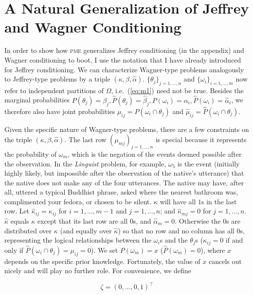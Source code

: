 \documentclass[entropy,article,accept,oneauthor,pdftex,12pt,a4paper]{mdpi}
\begin{document}
\section{A Natural Generalization of Jeffrey and Wagner Conditioning}
\label{Generalization}

In order to show how \textsc{pme} generalizes Jeffrey conditioning (in
the appendix) and Wagner conditioning to boot, I use the notation that
I have already introduced for Jeffrey conditioning. We can
characterize Wagner-type problems analogously to Jeffrey-type problems
by a triple $(\kappa,\beta,\hat{\alpha})$.
$\{\theta_{j}\}_{j=1,\ldots,n}$ and $\{\omega_{i}\}_{i=1,\ldots,m}$
now refer to independent partitions of $\Omega$, i.e.\ (\ref{eq:m1})
need not be true. Besides the marginal probabilities
$P(\theta_{j})=\beta_{j}, \hat{P}(\theta_{j})=\hat{\beta}_{j},
P(\omega_{i})=\alpha_{i},\hat{P}(\omega_{i})=\hat{\alpha}_{i}$, we
therefore also have joint probabilities
$\mu_{ij}=P(\omega_{i}\cap\theta_{j})$ and
$\hat{\mu}_{ij}=\hat{P}(\omega_{i}\cap\theta_{j})$.

Given the specific nature of Wagner-type problems, there are a few
constraints on the triple $(\kappa,\beta,\hat{\alpha})$. The last row
$(\mu_{mj})_{j=1,\ldots,n}$ is special because it represents the
probability of $\omega_{m}$, which is the negation of the events
deemed possible after the observation. In the \emph{Linguist} problem,
for example, $\omega_{5}$ is the event (initially highly likely, but
impossible after the observation of the native's utterance) that the
native does not make any of the four utterances. The native may have,
after all, uttered a typical Buddhist phrase, asked where the nearest
bathroom was, complimented your fedora, or chosen to be silent.
$\kappa$ will have all $1$s in the last row. Let
$\hat{\kappa}_{ij}=\kappa_{ij}$ for $i=1,\ldots,m-1$ and
$j=1,\ldots,n$; and $\hat{\kappa}_{mj}=0$ for $j=1,\ldots,n$.
$\hat{\kappa}$ equals $\kappa$ except that its last row are all $0$s,
and $\hat{\alpha}_{m}=0$. Otherwise the $0$s are distributed over
$\kappa$ (and equally over $\hat{\kappa}$) so that no row and no
column has all $0$s, representing the logical relationships between
the $\omega_{i}$s and the $\theta_{j}$s ($\kappa_{ij}=0$ if and only
if $\hat{P}(\omega_{i}\cap\theta_{j})=\mu_{ij}=0$). We set
$P(\omega_{m})=x$ ($\hat{P}(\omega_{m})=0$), where $x$ depends on the
specific prior knowledge. Fortunately, the value of $x$ cancels out
nicely and will play no further role. For convenience, we define

\begin{equation}
\label{eq:zeta}
\zeta=(0,\ldots,0,1)^{\top}
\end{equation}
\end{document}
